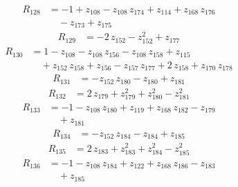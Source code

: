 \begin{equation*}\begin{aligned}
R_{128}&=-1 +z_{108} -z_{108}\,z_{174} +z_{114} +z_{168}\,z_{176} \\
&\quad -z_{173} +z_{175}
\end{aligned}\end{equation*}
\begin{equation*}\begin{aligned}
R_{129}&=-2\,z_{152} -z_{152}^{2} +z_{177}
\end{aligned}\end{equation*}
\begin{equation*}\begin{aligned}
R_{130}&=1 -z_{108} -z_{108}\,z_{156} -z_{108}\,z_{158} +z_{115} \\
&\quad +z_{152}\,z_{158} +z_{156} -z_{157}\,z_{177} +2\,z_{158} +z_{170}\,z_{178}
\end{aligned}\end{equation*}
\begin{equation*}\begin{aligned}
R_{131}&=-z_{152}\,z_{180} -z_{180} +z_{181}
\end{aligned}\end{equation*}
\begin{equation*}\begin{aligned}
R_{132}&=2\,z_{179} +z_{179}^{2} +z_{180}^{2} -z_{181}^{2}
\end{aligned}\end{equation*}
\begin{equation*}\begin{aligned}
R_{133}&=-1 -z_{108}\,z_{180} +z_{119} +z_{168}\,z_{182} -z_{179} \\
&\quad +z_{181}
\end{aligned}\end{equation*}
\begin{equation*}\begin{aligned}
R_{134}&=-z_{152}\,z_{184} -z_{184} +z_{185}
\end{aligned}\end{equation*}
\begin{equation*}\begin{aligned}
R_{135}&=2\,z_{183} +z_{183}^{2} +z_{184}^{2} -z_{185}^{2}
\end{aligned}\end{equation*}
\begin{equation*}\begin{aligned}
R_{136}&=-1 -z_{108}\,z_{184} +z_{122} +z_{168}\,z_{186} -z_{183} \\
&\quad +z_{185}
\end{aligned}\end{equation*}
